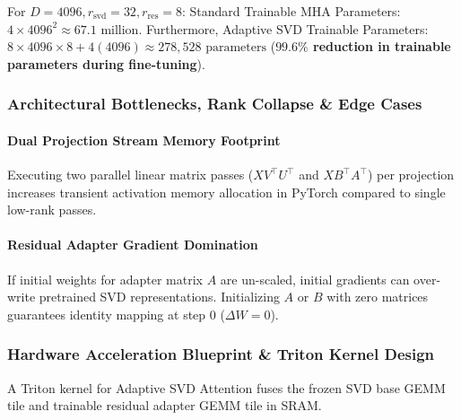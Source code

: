 For $D = 4096, r_{\text{svd}} = 32, r_{\text{res}} = 8$:
Standard Trainable MHA Parameters: $4 \times 4096^2 \approx 67.1 \text{ million}$. Furthermore, Adaptive SVD Trainable Parameters: $8 \times 4096 \times 8 + 4(4096) \approx 278,528 \text{ parameters}$ (\textbf{$99.6\%$ reduction in trainable parameters during fine-tuning}).



\subsubsection*{Architectural Bottlenecks, Rank Collapse \& Edge Cases}

\paragraph{Dual Projection Stream Memory Footprint}
Executing two parallel linear matrix passes ($X V^\top U^\top$ and $X B^\top A^\top$) per projection increases transient activation memory allocation in PyTorch compared to single low-rank passes.

\paragraph{Residual Adapter Gradient Domination}
If initial weights for adapter matrix $A$ are un-scaled, initial gradients can over-write pretrained SVD representations. Initializing $A$ or $B$ with zero matrices guarantees identity mapping at step 0 ($\Delta W = 0$).


\subsubsection*{Hardware Acceleration Blueprint \& Triton Kernel Design}

A Triton kernel for Adaptive SVD Attention fuses the frozen SVD base GEMM tile and trainable residual adapter GEMM tile in SRAM.

